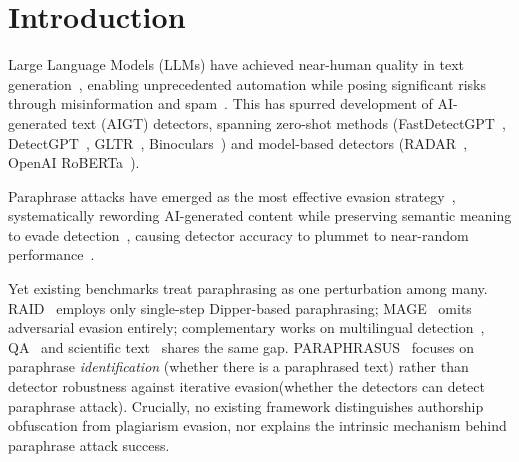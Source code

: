 \documentclass[runningheads]{llncs}
\begin{document}
%
\section{Introduction}

Large Language Models (LLMs) have achieved near-human quality in text 
generation~\cite{OpenAI2023GPT4,GeminiTeam2025Gemini2.5,kevian2024capabilitieslargelanguagemodels}, 
enabling unprecedented automation while posing significant risks through 
misinformation and spam~\cite{leite2023detecting,Yeh2023EvaluatingIL}. 
This has spurred development of AI-generated text (AIGT) detectors, 
spanning zero-shot methods (FastDetectGPT~\cite{bao2024fastdetectgpt}, 
DetectGPT~\cite{mitchell2023detectgptzeroshotmachinegeneratedtext}, 
GLTR~\cite{gehrmann2019gltrstatisticaldetectionvisualization}, 
Binoculars~\cite{hans2024spottingllmsbinocularszeroshot}) and 
model-based detectors (RADAR~\cite{hu2023radarrobustaitextdetection}, 
OpenAI RoBERTa~\cite{solaiman2019release}).

Paraphrase attacks have emerged as the most effective evasion 
strategy~\cite{creo2025completeevasionzeromodification,lu2024largelanguagemodelsguided,zhou2024humanizingmachinegeneratedcontentevading,pudasaini-etal-2025-benchmarking}, 
systematically rewording AI-generated content while preserving semantic 
meaning to evade 
detection~\cite{krishna2023paraphrasingevadesdetectorsaigenerated,sadasivan2023canaigeneratedtextreliably}, 
causing detector accuracy to plummet to near-random 
performance~\cite{Weber_Wulff_2023,shportko-verbitsky-2025-paraphrasing}.

Yet existing benchmarks treat paraphrasing as one perturbation among 
many. RAID~\cite{raid} employs only single-step Dipper-based 
paraphrasing; MAGE~\cite{li2024magemachinegeneratedtextdetection} omits 
adversarial evasion entirely; complementary works on multilingual 
detection~\cite{Macko_2023}, QA~\cite{su2024hc3plussemanticinvarianthuman} and scientific text~\cite{Mosca2023DistinguishingFF} shares the 
same gap. PARAPHRASUS~\cite{michail2024paraphrasuscomprehensivebenchmark} 
focuses on paraphrase \textit{identification} (whether there is a paraphrased text) rather than detector 
robustness against iterative evasion(whether the detectors can detect paraphrase attack). Crucially, no existing framework 
distinguishes authorship obfuscation from plagiarism evasion, nor 
explains the intrinsic mechanism behind paraphrase attack success.
\end{document}
